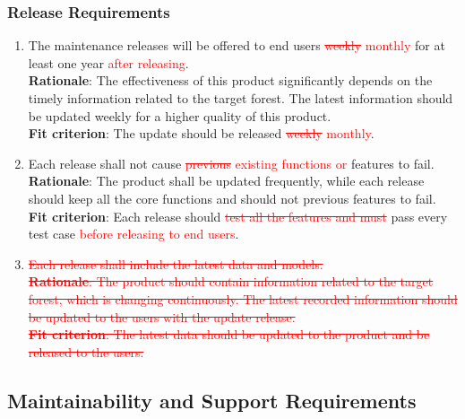 \documentclass{article}
\begin{document}
\subsubsection{Release Requirements}
\begin{enumerate}[OE4.1]
    \item The maintenance releases will be offered to end users \textcolor{red}{\st{weekly}
    monthly} for at least one year
   \textcolor{red}{after releasing}.\\
    \textbf{Rationale}: The effectiveness of this product significantly depends on the timely information related to the target forest. The latest information should be updated weekly for a higher quality of this product.\\
    \textbf{Fit criterion}: The update should be released \textcolor{red}{\st{weekly}
    monthly}.\\
    \item Each release shall not cause \textcolor{red}{\st{previous} existing functions or} features 
    to fail. \\
    \textbf{Rationale}: The product shall be updated frequently, while each release should keep all the core functions and should not previous features to fail.\\
    \textbf{Fit criterion}: Each release should \textcolor{red}{\st{test all the features and must}}
     pass every test case \textcolor{red}{before releasing to end users}.\\
    
    \item \textcolor{red}{\st{Each release shall include the latest data and models. \\
    \textbf{Rationale}: The product should contain information related to the target forest, which is
     changing continuously. The latest recorded information should be updated to the users with the
      update release.\\
    \textbf{Fit criterion}: The latest data should be updated to the product and be released to the
     users. }}
\end{enumerate}
\subsection{Maintainability and Support Requirements}
\end{document}
